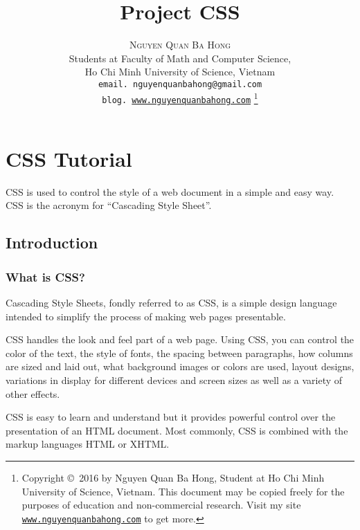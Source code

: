 \documentclass[a4paper,oneside]{book}
\title{\Huge Project CSS}
\author{\textsc{Nguyen Quan Ba Hong}\\
{\small Students at Faculty of Math and Computer Science,}\\ 
{\small Ho Chi Minh University of Science, Vietnam} \\
{\small \texttt{email. nguyenquanbahong@gmail.com}}\\
{\small \texttt{blog. \url{www.nguyenquanbahong.com}} 
\footnote{Copyright \copyright\ 2016 by Nguyen Quan Ba Hong, Student at Ho Chi Minh University of Science, Vietnam. This document may be copied freely for the purposes of education and non-commercial research. Visit my site \texttt{\url{www.nguyenquanbahong.com}} to get more.}}}
\numberwithin{equation}{chapter}
\begin{document}
\frontmatter
\maketitle
\tableofcontents
\listoftables


\mainmatter
\chapter{CSS Tutorial}
CSS is used to control the style of a web document in a simple and easy way. CSS is the acronym for ``Cascading Style Sheet''. 
\section{Introduction}
\subsection{What is CSS?}
Cascading Style Sheets, fondly referred to as CSS, is a simple design language intended to simplify the process of making web pages presentable.

CSS handles the look and feel part of a web page. Using CSS, you can control the color of the text, the style of fonts, the spacing between paragraphs, how columns are sized and laid out, what background images or colors are used, layout designs, variations in display for different devices and screen sizes as well as a variety of other effects. 

CSS is easy to learn and understand but it provides powerful control over the presentation of an HTML document. Most commonly, CSS is combined with the markup languages HTML or XHTML.
\end{document}
